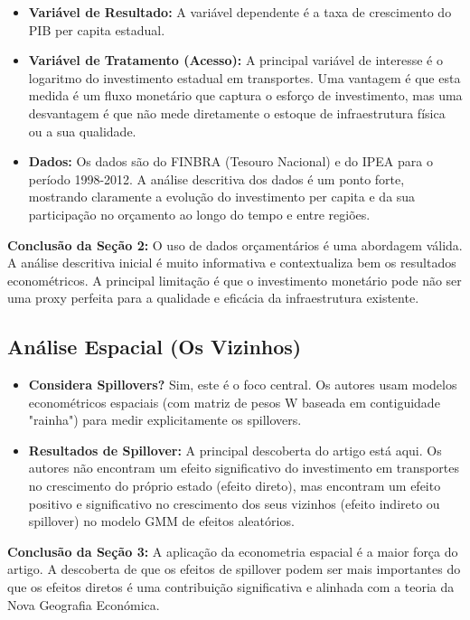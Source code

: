 \documentclass[12pt, a4paper]{article}
\begin{document}
\begin{itemize}
    \item \textbf{Variável de Resultado:} A variável dependente é a taxa de crescimento do PIB per capita estadual.
    \item \textbf{Variável de Tratamento (Acesso):} A principal variável de interesse é o logaritmo do investimento estadual em transportes. Uma vantagem é que esta medida é um fluxo monetário que captura o esforço de investimento, mas uma desvantagem é que não mede diretamente o estoque de infraestrutura física ou a sua qualidade.
    \item \textbf{Dados:} Os dados são do FINBRA (Tesouro Nacional) e do IPEA para o período 1998-2012. A análise descritiva dos dados é um ponto forte, mostrando claramente a evolução do investimento per capita e da sua participação no orçamento ao longo do tempo e entre regiões.
\end{itemize}

\noindent\textbf{Conclusão da Seção 2:} O uso de dados orçamentários é uma abordagem válida. A análise descritiva inicial é muito informativa e contextualiza bem os resultados econométricos. A principal limitação é que o investimento monetário pode não ser uma proxy perfeita para a qualidade e eficácia da infraestrutura existente.

\subsection{Análise Espacial (Os Vizinhos)}

\begin{itemize}
    \item \textbf{Considera Spillovers?} Sim, este é o foco central. Os autores usam modelos econométricos espaciais (com matriz de pesos W baseada em contiguidade "rainha") para medir explicitamente os spillovers.
    \item \textbf{Resultados de Spillover:} A principal descoberta do artigo está aqui. Os autores não encontram um efeito significativo do investimento em transportes no crescimento do próprio estado (efeito direto), mas encontram um efeito positivo e significativo no crescimento dos seus vizinhos (efeito indireto ou spillover) no modelo GMM de efeitos aleatórios.
\end{itemize}

\noindent\textbf{Conclusão da Seção 3:} A aplicação da econometria espacial é a maior força do artigo. A descoberta de que os efeitos de spillover podem ser mais importantes do que os efeitos diretos é uma contribuição significativa e alinhada com a teoria da Nova Geografia Económica.
\end{document}
